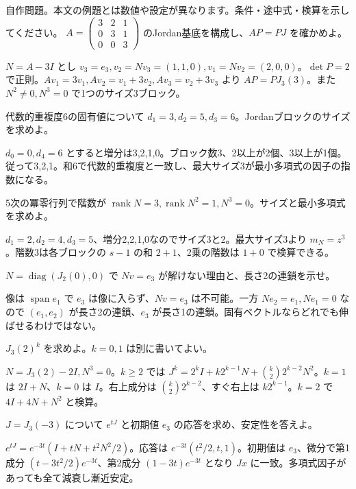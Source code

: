 \documentclass[11pt]{article}
\begin{document}
自作問題。本文の例題とは数値や設定が異なります。条件・途中式・検算を示してください。
\problem[連鎖を作る]
$A=\begin{pmatrix}3&2&1\\0&3&1\\0&0&3\end{pmatrix}$ のJordan基底を構成し、$AP=PJ$ を確かめよ。
\begin{ans}
$N=A-3I$ とし $v_3=e_3,v_2=Nv_3=(1,1,0),v_1=Nv_2=(2,0,0)$。$\det P=2$ で正則。$Av_1=3v_1,Av_2=v_1+3v_2,Av_3=v_2+3v_3$ より $AP=PJ_3(3)$。また $N^2\ne0,N^3=0$ で1つのサイズ3ブロック。
\end{ans}
\problem[核からサイズを復元]
代数的重複度6の固有値について $d_1=3,d_2=5,d_3=6$。Jordanブロックのサイズを求めよ。
\begin{ans}
$d_0=0,d_4=6$ とすると増分は3,2,1,0。ブロック数3、2以上が2個、3以上が1個。従って3,2,1。和6で代数的重複度と一致し、最大サイズ3が最小多項式の因子の指数になる。
\end{ans}
\newpage
\problem[階数からサイズを復元]
5次の冪零行列で階数が $\operatorname{rank}N=3,\operatorname{rank}N^2=1,N^3=0$。サイズと最小多項式を求めよ。
\begin{ans}
$d_1=2,d_2=4,d_3=5$、増分2,2,1,0なのでサイズ3と2。最大サイズ3より $m_N=z^3$。階数3は各ブロックの $s-1$ の和 $2+1$、2乗の階数は $1+0$ で検算できる。
\end{ans}
\problem[伸ばせない固有ベクトル]
$N=\operatorname{diag}(J_2(0),0)$ で $Nv=e_3$ が解けない理由と、長さ2の連鎖を示せ。
\begin{ans}
像は $\operatorname{span}e_1$ で $e_3$ は像に入らず、$Nv=e_3$ は不可能。一方 $Ne_2=e_1,Ne_1=0$ なので $(e_1,e_2)$ が長さ2の連鎖、$e_3$ が長さ1の連鎖。固有ベクトルならどれでも伸ばせるわけではない。
\end{ans}
\newpage
\problem[ブロックの累乗]
$J_3(2)^k$ を求めよ。$k=0,1$ は別に書いてよい。
\begin{ans}
$N=J_3(2)-2I,N^3=0$。$k\ge2$ では $J^k=2^kI+k2^{k-1}N+\binom{k}{2}2^{k-2}N^2$。$k=1$ は $2I+N$、$k=0$ は $I$。右上成分は $\binom{k}{2}2^{k-2}$、すぐ右上は $k2^{k-1}$。$k=2$ で $4I+4N+N^2$ と検算。
\end{ans}
\problem[指数関数]
$J=J_3(-3)$ について $e^{tJ}$ と初期値 $e_3$ の応答を求め、安定性を答えよ。
\begin{ans}
$e^{tJ}=e^{-3t}(I+tN+t^2N^2/2)$。応答は $e^{-3t}(t^2/2,t,1)$。初期値は $e_3$、微分で第1成分 $(t-3t^2/2)e^{-3t}$、第2成分 $(1-3t)e^{-3t}$ となり $Jx$ に一致。多項式因子があっても全て減衰し漸近安定。
\end{ans}
\end{document}
